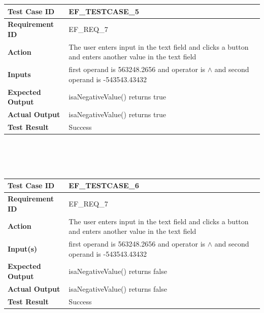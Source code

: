 \documentclass[11pt, english]{report}
\begin{document}
\setlength{\tabcolsep}{18pt}
\renewcommand{\arraystretch}{1.5}
\begin{tabular}{ |p{4cm}|p{8cm}| }
\hline
\textbf{Test Case ID} &  EF\_TESTCASE\_5 \\ \hline 
\textbf{Requirement ID} & EF\_REQ\_7\\ \hline
\textbf{Action} & The user enters input in the text field and clicks a button and enters another value in the text field\\ \hline
\textbf{Inputs} & first operand is 563248.2656 and operator is $\wedge$ and second operand is -543543.43432 \\ \hline
\textbf{Expected Output} & isaNegativeValue() returns true \\ \hline
\textbf{Actual Output} & isaNegativeValue() returns true \\ \hline
\textbf{Test Result} & Success \\ 
\hline
\end{tabular} \\ \\ \\

\setlength{\tabcolsep}{18pt}
\renewcommand{\arraystretch}{1.5}
\begin{tabular}{ |p{4cm}|p{8cm}| }
\hline
\textbf{Test Case ID} &  EF\_TESTCASE\_6 \\ \hline 
\textbf{Requirement ID} & EF\_REQ\_7\\ \hline
\textbf{Action} & The user enters input in the text field and clicks a button and enters another value in the text field\\ \hline
\textbf{Input(s)} & first operand is 563248.2656 and operator is $\wedge$ and second operand is -543543.43432 \\ \hline
\textbf{Expected Output} & isaNegativeValue() returns false \\ \hline
\textbf{Actual Output} & isaNegativeValue() returns false \\ \hline
\textbf{Test Result} & Success \\ 
\hline
\end{tabular} \\ \\ \\
\end{document}
